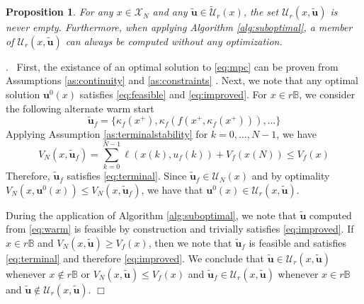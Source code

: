 \documentclass{article}
\newtheorem{proposition}{Proposition}
\newenvironment{proof}{\noindent {\em Proof}.\ }{\hspace*{\fill}$\Box$\medskip\\}
\begin{document}
\begin{proposition}
\label{pp:opt}
For any $x \in \mathcal{X}_N$ and any $\tilde{\mathbf{u}} \in \tilde{\mathcal{U}}_r(x)$, the set 
$\mathcal{U}_r(x,\tilde{\mathbf{u}})$ is never empty. Furthermore, when applying Algorithm 
\ref{alg:suboptimal}, a member of $\mathcal{U}_r(x,\tilde{\mathbf{u}})$ can always be computed without
any optimization.
\end{proposition}
\begin{proof}
First, the existance of an optimal solution to \eqref{eq:mpc} can be proven from Assumptions
\ref{as:continuity} and \ref{as:constraints}
\citep[p. 97-98]{rawlings:mayne:2009}.
Next, we note that any optimal solution $\mathbf{u}^0(x)$ satisfies \eqref{eq:feasible} and 
\eqref{eq:improved}. For $x \in r\mathbb{B}$, we consider the following alternate warm start
\begin{equation}
\label{eq:altwarm}
\tilde{\mathbf{u}}_f = \{\kappa_f(x^+),\kappa_f(f(x^+,\kappa_f(x^+))),\dots\} 
\end{equation}
Applying Assumption \ref{as:terminalstability} for $k = 0, \dots, N-1$, we have
\begin{equation*}
V_N(x,\tilde{\mathbf{u}}_f) = \sum_{k=0}^{N-1}\ell(x(k),u_f(k)) + V_f(x(N)) \leq V_f(x)
\end{equation*}
Therefore, $\tilde{\mathbf{u}}_f$ satisfies \eqref{eq:terminal}. 
Since $\tilde{\mathbf{u}}_f \in \mathcal{U}_N(x)$ and by optimality $V_N(x,\mathbf{u}^0(x)) \leq 
V_N(x,\tilde{\mathbf{u}}_f)$, we have that $\mathbf{u}^0(x) \in 
\mathcal{U}_r(x,\tilde{\mathbf{u}})$.

During the application of Algorithm \ref{alg:suboptimal}, we note that $\tilde{\mathbf{u}}$ computed
from \eqref{eq:warm} is feasible by construction and trivially satisfies \eqref{eq:improved}.
If $x \in r\mathbb{B}$ and $V_N(x,\tilde{\mathbf{u}}) \geq V_f(x)$, then we note that 
$\tilde{\mathbf{u}}_f$ is feasible and satisfies \eqref{eq:terminal} and therefore \eqref{eq:improved}.
We conclude that $\tilde{\mathbf{u}} \in \mathcal{U}_r(x,\tilde{\mathbf{u}})$ whenever $x \notin r\mathbb{B}$ or
$V_N(x,\tilde{\mathbf{u}}) \leq V_f(x)$
and $\tilde{\mathbf{u}}_f \in \mathcal{U}_r(x,\tilde{\mathbf{u}})$ whenever $x \in r\mathbb{B}$
and $\tilde{\mathbf{u}} \notin \mathcal{U}_r(x,\tilde{\mathbf{u}})$.
\end{proof}

\end{document}
